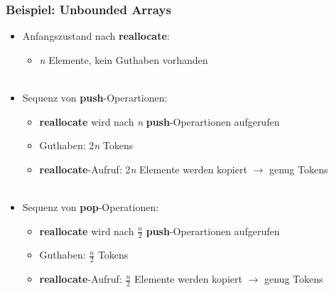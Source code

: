 \begin{frame}
	\frametitle{Beispiel: Unbounded Arrays}
	\begin{itemize}
		\item Anfangszustand nach \textbf{reallocate}:
		\begin{itemize}
			\item \textit{n} Elemente, kein Guthaben vorhanden \\ \ \\
		\end{itemize}


		\item Sequenz von \textbf{push}-Operartionen:
		\begin{itemize}
			\item \textbf{reallocate} wird nach \textit{n} \textbf{push}-Operartionen aufgerufen
			\item Guthaben: 2\textit{n} Tokens
			\item \textbf{reallocate}-Aufruf: 2\textit{n} Elemente werden kopiert $\rightarrow$ genug Tokens \\ \ \\
		\end{itemize} 

		\item Sequenz von \textbf{pop}-Operationen:
		\begin{itemize}
			\item \textbf{reallocate} wird nach \textit{$\frac{n}{2}$} \textbf{push}-Operartionen aufgerufen
			\item Guthaben: \textit{$\frac{n}{2}$} Tokens
			\item \textbf{reallocate}-Aufruf: \textit{$\frac{n}{2}$} Elemente werden kopiert $\rightarrow$ genug Tokens \\ \ \\
		\end{itemize} 

	\end{itemize}
\end{frame}


